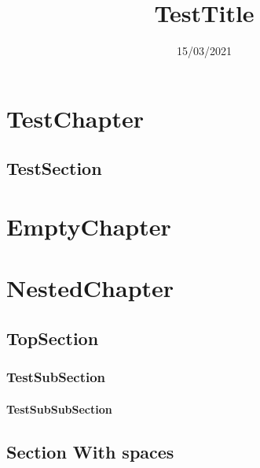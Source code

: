 \documentclass{TestClass}
\title{TestTitle}
\date{15/03/2021}
\begin{document}
\chapter{TestChapter}
\section{TestSection}
\chapter{EmptyChapter}
\chapter{NestedChapter}
\section{TopSection}
\subsection{TestSubSection}
\subsubsection{TestSubSubSection}
\section{Section With spaces}
\end{document}
